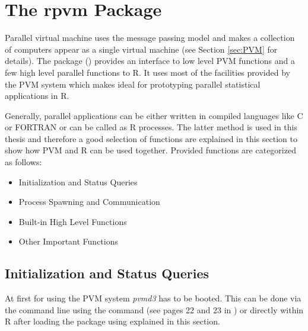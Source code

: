 \section{The rpvm Package}
\label{sec:rpvm}
Parallel virtual machine uses the message passing model and makes a
collection of computers appear as a single virtual machine (see Section
\ref{sec:PVM} for details).
The package  (\cite{nali07rpvm}) provides an interface to
low level PVM functions and
a few high level parallel functions to R. It uses most of the
facilities provided by the PVM system which makes  ideal for
prototyping parallel statistical applications in R.

Generally, parallel applications can be either written in compiled
languages like C or 
FORTRAN or can be called as R processes. The latter method is used in
this thesis and therefore a good selection of 
functions are explained in this section to show how PVM and R can be
used together. Provided functions are categorized as follows:

\begin{itemize}
\item Initialization and Status Queries
\item Process Spawning and Communication
\item Built-in High Level Functions
\item Other Important Functions
\end{itemize}  

\subsection{Initialization and Status Queries}

At first for using the PVM system \textit{pvmd3} has to be
booted. This can be done via the command line using the 
command (see pages 22 and 23 in \cite{geist94pvm}) or directly within
R after loading the  package using 
explained in this section.


